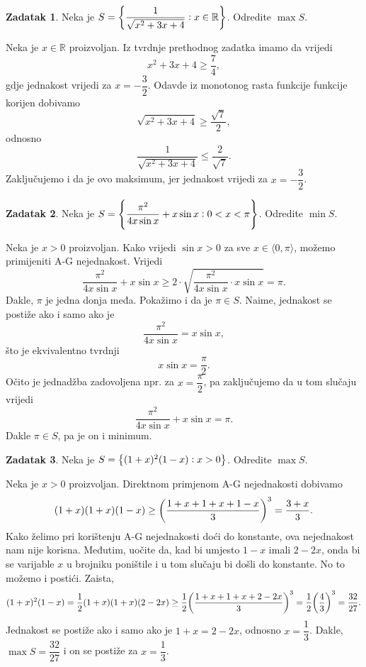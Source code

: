 \documentclass{book}
\let\originalleft\left
\let\originalright\right
\renewcommand{\left}{\mathopen{}\mathclose\bgroup\originalleft}
\renewcommand{\right}{\aftergroup\egroup\originalright}
\renewenvironment{proof}{%
    \vspace{-\parskip}\begin{oldproof}%
    }{%
    \end{oldproof}%
}
\theoremstyle{definition}
\theoremstyle{definition}
\newtheorem{exercise}{Zadatak}
\theoremstyle{remark}
\begin{document}
\begin{exercise}
Neka je $S=\left\{\dfrac{1}{\sqrt{x^2+3x+4}} : x\in \mathbb{R}\right\}$. Odredite $\max{S}$.
\end{exercise}
\begin{proof}[Rješenje]
Neka je $x\in \mathbb{R}$ proizvoljan. Iz tvrdnje prethodnog zadatka imamo da vrijedi $$x^2+3x+4\geq \dfrac{7}{4},$$
gdje jednakost vrijedi za $x=-\dfrac{3}{2}$. Odavde iz monotonog rasta funkcije funkcije korijen dobivamo $$\sqrt{x^2+3x+4}\geq \dfrac{\sqrt{7}}{2},$$
odnosno
$$\dfrac{1}{\sqrt{x^2+3x+4}}\leq \dfrac{2}{\sqrt{7}}.$$ Zaključujemo i da je ovo maksimum, jer jednakost vrijedi za $x=-\dfrac{3}{2}$.
\end{proof}
\begin{exercise}
Neka je $S=\left\{\dfrac{\pi^2}{4x\sin{x}}+x\sin{x} : 0<x<\pi\right\}$. Odredite $\min{S}$.
\end{exercise}
\begin{proof}[Rješenje]
Neka je $x>0$ proizvoljan. Kako vrijedi $\sin{x}>0$ za sve $x\in \langle 0, \pi\rangle$, možemo primijeniti A-G nejednakost. Vrijedi
$$\dfrac{\pi^2}{4x\sin{x}}+x\sin{x}\geq 2\cdot \sqrt{\dfrac{\pi^2}{4x\sin{x}}\cdot x\sin{x}}=\pi.$$
Dakle, $\pi$ je jedna donja međa. Pokažimo i da je $\pi\in S$. Naime, jednakost se postiže ako i samo ako je $$\dfrac{\pi^2}{4x\sin{x}}=x\sin{x},$$ što je ekvivalentno tvrdnji $$x\sin{x}=\dfrac{\pi}{2}.$$ Očito je jednadžba zadovoljena npr. za $x=\dfrac{\pi}{2}$, pa zaključujemo da u tom slučaju vrijedi $$\dfrac{\pi^2}{4x\sin{x}}+x\sin{x}=\pi.$$ Dakle $\pi\in S$, pa je on i minimum.
\end{proof}
\begin{exercise}
Neka je $S=\left\{(1+x)^2(1-x) : x>0\right\}$. Odredite $\max{S}$.
\end{exercise}
\begin{proof}[Rješenje]
Neka je $x>0$ proizvoljan. Direktnom primjenom A-G nejednakosti dobivamo $$(1+x)(1+x)(1-x)\geq \left(\dfrac{1+x+1+x+1-x}{3}\right)^3=\dfrac{3+x}{3}.$$ Kako želimo pri korištenju A-G nejednakosti doći do konstante, ova nejednakost nam nije korisna. Međutim, uočite da, kad bi umjesto $1-x$ imali $2-2x$, onda bi se varijable $x$ u brojniku poništile i u tom slučaju bi došli do konstante. No to možemo i postići. Zaista,
$$(1+x)^2(1-x)=\dfrac{1}{2}(1+x)(1+x)(2-2x)\geq \dfrac{1}{2}\left(\dfrac{1+x+1+x+2-2x}{3}\right)^3=\dfrac{1}{2}\left(\dfrac{4}{3}\right)^3=\dfrac{32}{27}.$$
Jednakost se postiže ako i samo ako je $1+x=2-2x$, odnosno $x=\dfrac{1}{3}$. Dakle, $\max{S}=\dfrac{32}{27}$ i on se postiže za $x=\dfrac{1}{3}$.
\end{proof}
\end{document}
